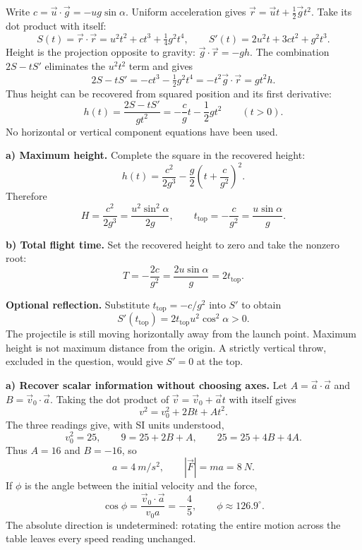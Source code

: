 \documentclass[11pt,a4paper]{article}
\begin{document}


Write $c=\vec u\cdot\vec g=-ug\sin\alpha$. Uniform acceleration gives
$\vec r=\vec u t+\tfrac12\vec g t^2$. Take its dot product with itself:
\[
S(t)=\vec r\cdot\vec r=u^2t^2+ct^3+\tfrac14g^2t^4,
\qquad S'(t)=2u^2t+3ct^2+g^2t^3.
\]
Height is the projection opposite to gravity: $\vec g\cdot\vec r=-gh$.
The combination $2S-tS'$ eliminates the $u^2t^2$ term and gives
\[
2S-tS'=-ct^3-\tfrac12g^2t^4
=-t^2\vec g\cdot\vec r=gt^2h.
\]
Thus height can be recovered from squared position and its first derivative:
\[
\boxed{h(t)=\frac{2S-tS'}{gt^2}
=-\frac cg t-\frac12gt^2}\qquad(t>0).
\]
No horizontal or vertical component equations have been used.

\textbf{a) Maximum height.} Complete the square in the recovered height:
\[
h(t)=\frac{c^2}{2g^3}-\frac g2\left(t+\frac{c}{g^2}\right)^2.
\]
Therefore
\[
\boxed{H=\frac{c^2}{2g^3}=\frac{u^2\sin^2\alpha}{2g},
\qquad t_{\mathrm{top}}=-\frac{c}{g^2}=\frac{u\sin\alpha}{g}.}
\]

\textbf{b) Total flight time.} Set the recovered height to zero and take
the nonzero root:
\[
\boxed{T=-\frac{2c}{g^2}=\frac{2u\sin\alpha}{g}=2t_{\mathrm{top}}.}
\]

\textbf{Optional reflection.} Substitute $t_{\mathrm{top}}=-c/g^2$ into
$S'$ to obtain
\[
S'(t_{\mathrm{top}})=2t_{\mathrm{top}}u^2\cos^2\alpha>0.
\]
The projectile is still moving horizontally away from the launch point.
Maximum height is not maximum distance from the origin. A strictly vertical
throw, excluded in the question, would give $S'=0$ at the top.


\clearpage
{}

\textbf{a) Recover scalar information without choosing axes.}
Let $A=\vec a\cdot\vec a$ and $B=\vec v_0\cdot\vec a$.
Taking the dot product of $\vec v=\vec v_0+\vec a t$ with itself gives
\[
v^2=v_0^2+2Bt+At^2.
\]
The three readings give, with SI units understood,
\[
v_0^2=25,\qquad 9=25+2B+A,\qquad 25=25+4B+4A.
\]
Thus $A=16$ and $B=-16$, so
\[
\boxed{a=\SI{4}{m/s^2},\qquad |\vec F|=ma=\SI{8}{N}.}
\]
If $\phi$ is the angle between the initial velocity and the force,
\[
\boxed{\cos\phi=\frac{\vec v_0\cdot\vec a}{v_0a}
=-\frac45,\qquad \phi\approx126.9^\circ.}
\]
The absolute direction is undetermined: rotating the entire motion across
the table leaves every speed reading unchanged.
\end{document}

